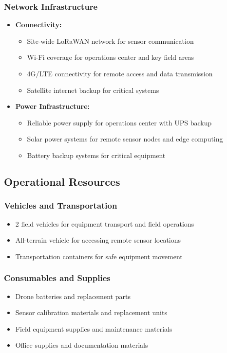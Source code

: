 \subsubsection{Network Infrastructure}
\begin{itemize}
    \item \textbf{Connectivity:}
    \begin{itemize}
        \item Site-wide LoRaWAN network for sensor communication
        \item Wi-Fi coverage for operations center and key field areas
        \item 4G/LTE connectivity for remote access and data transmission
        \item Satellite internet backup for critical systems
    \end{itemize}
    
    \item \textbf{Power Infrastructure:}
    \begin{itemize}
        \item Reliable power supply for operations center with UPS backup
        \item Solar power systems for remote sensor nodes and edge computing
        \item Battery backup systems for critical equipment
    \end{itemize}
\end{itemize}

\subsection{Operational Resources}

\subsubsection{Vehicles and Transportation}
\begin{itemize}
    \item 2 field vehicles for equipment transport and field operations
    \item All-terrain vehicle for accessing remote sensor locations
    \item Transportation containers for safe equipment movement
\end{itemize}

\subsubsection{Consumables and Supplies}
\begin{itemize}
    \item Drone batteries and replacement parts
    \item Sensor calibration materials and replacement units
    \item Field equipment supplies and maintenance materials
    \item Office supplies and documentation materials
\end{itemize}

